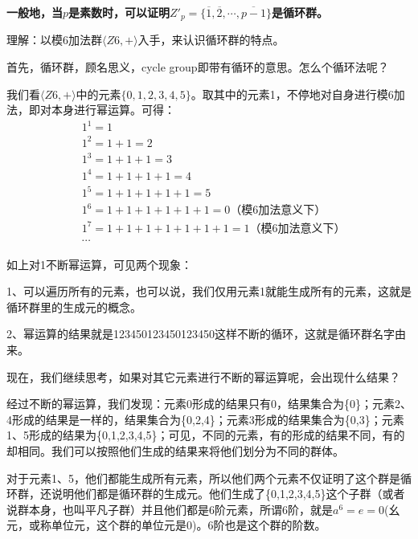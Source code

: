 \documentclass[12pt]{article}
\begin{document}
\begin{mdframed}[
linecolor=black!40,outerlinewidth=1pt,roundcorner=.5em,innertopmargin=1ex,innerbottommargin=.5\baselineskip,innerrightmargin=1em,innerleftmargin=1em,backgroundcolor=gray!5,
]
\textbf{
一般地，当$p$是素数时，可以证明$Z'_p = \{\overline{1}, \overline{2}, \cdots, \overline{p-1}\}$是循环群。  
}
\end{mdframed}

\begin{framed}
\small {
理解：以模6加法群$\langle Z6, +\rangle$入手，来认识循环群的特点。

首先，循环群，顾名思义，cycle group即带有循环的意思。怎么个循环法呢？

我们看$\langle Z6, +\rangle$中的元素$\{0,1,2,3,4,5\}$。取其中的元素1，不停地对自身进行模6加法，即对本身进行幂运算。可得：
\begin{align*}
& 1^1=1 \\
& 1^2=1+1=2 \\
& 1^3=1+1+1=3 \\
& 1^4=1+1+1+1=4 \\
& 1^5=1+1+1+1+1=5 \\
& 1^6=1+1+1+1+1+1=0 \text{（模6加法意义下）}\\
& 1^7=1+1+1+1+1+1+1=1\text{（模6加法意义下）} \\
& \cdots
\end{align*}

如上对1不断幂运算，可见两个现象：

1、可以遍历所有的元素，也可以说，我们仅用元素1就能生成所有的元素，这就是循环群里的生成元的概念。

2、幂运算的结果就是123450123450123450这样不断的循环，这就是循环群名字由来。

现在，我们继续思考，如果对其它元素进行不断的幂运算呢，会出现什么结果？

经过不断的幂运算，我们发现：元素0形成的结果只有0，结果集合为\{0\}；元素2、4形成的结果是一样的，结果集合为\{0,2,4\}；元素3形成的结果集合为\{0,3\}；元素1、5形成的结果为\{0,1,2,3,4,5\}；可见，不同的元素，有的形成的结果不同，有的却相同。我们可以按照他们生成的结果来将他们划分为不同的群体。

对于元素1、5，他们都能生成所有元素，所以他们两个元素不仅证明了这个群是循环群，还说明他们都是循环群的生成元。他们生成了\{0,1,2,3,4,5\}这个子群（或者说群本身，也叫平凡子群）并且他们都是6阶元素，所谓6阶，就是$a^6=e=0$(幺元，或称单位元，这个群的单位元是0)。6阶也是这个群的阶数。

}
\end{framed}
\end{document}
